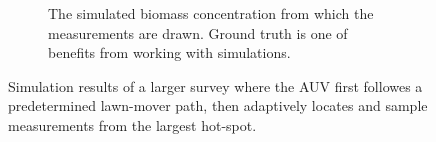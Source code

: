 \documentclass[conference]{IEEEtran}
\begin{document}
\begin{figure}[tbp]
\begin{subfigure}[b]{\linewidth}
         \caption{The simulated biomass concentration from which the
           measurements are drawn. Ground truth is one of benefits
           from working with simulations.}
         \label{fig:sim-gt}
     \end{subfigure}
     \caption{Simulation results of a larger survey where the AUV
       first followes a predetermined lawn-mover path, then adaptively
       locates and sample measurements from the largest hot-spot.}
        \label{fig:Simulation}
\end{figure}





\end{document}
